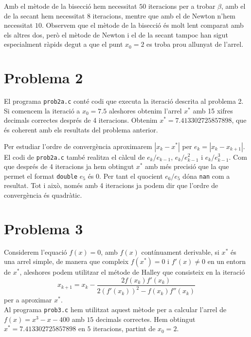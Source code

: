 \documentclass[12pt]{article}
\newcommand{\abs}[1]{\left\lvert#1\right\rvert}
\begin{document}
	Amb el mètode de la bisecció hem necessitat $50$ iteracions per a trobar $\beta$, amb el de la secant hem necessitat $8$ iteracions, mentre que amb el de Newton n'hem necessitat $10$. Observem que el mètode de la bisecció és molt lent comparat amb els altres dos, però el mètode de Newton i el de la secant tampoc han sigut especialment ràpids degut a que el punt $x_0=2$ es troba prou allunyat de l'arrel.
	
	\newpage

\section*{Problema 2}
El programa \texttt{prob2a.c} conté codi que executa la iteració descrita al problema 2. Si comencem la iteració a \( x_0 = \num{7.5} \) aleshores obtenim l'arrel \( x^* \) amb 15 xifres decimals correctes després de 4 iteracions. Obtenim \( x^* = \num{7.413302725857898} \), que és coherent amb els resultats del problema anterior.  

Per estudiar l'ordre de convergència aproximarem \( \abs{x_k - x^*} \) per \( e_k = \abs{x_{k} - x_{k+1}} \). El codi de \texttt{prob2a.c} també realitza el càlcul de \( e_k/e_{k-1} \), \( e_k/e_{k-1}^2 \) i \( e_k/e_{k-1}^3 \). Com que després de 4 iteracions ja hem obtingut \( x^* \) amb més precisió que la que permet el format \texttt{double} \( e_5 \) és 0. Per tant el quocient \( e_6 / e_5 \) dóna \texttt{nan} com a resultat. Tot i això, només amb 4 iteracions ja podem dir que l'ordre de convergència és quadràtic.  


\newpage

	\section*{Problema 3}
	Considerem l'equació $f(x)=0$, amb $f(x)$ contínuament derivable, si $x^*$ és una arrel simple, de manera que compleix $f(x^*)=0$ i $f'(x)\neq0$ en un entorn de $x^*$, aleshores podem utilitzar el métode de Halley que consisteix en la iteració
	\begin{equation}\label{halley}
		x_{k+1}=x_k-\dfrac{2f(x_k)f'(x_k)}{2(f'(x_k))^2-f(x_k)f''(x_k)}
	\end{equation}
	per a aproximar $x^*$.\\
	
	Al programa \texttt{prob3.c} hem utilitzat aquest mètode per a calcular l'arrel de $f(x)=x^3-x-400$ amb $15$ decimals correctes. Hem obtingut $x^*=7.413302725857898$ en $5$ iteracions, partint de $x_0=2$.
	
\end{document}
